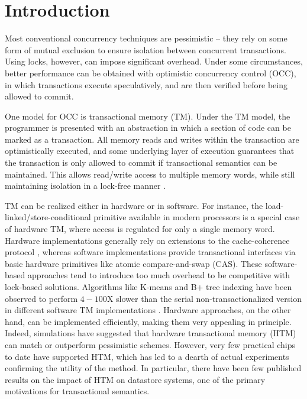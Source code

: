 \section{Introduction} \label{sec:intro}

Most conventional concurrency techniques are pessimistic -- they rely on some
form of mutual exclusion to ensure isolation between concurrent
transactions. Using locks, however, can impose significant overhead. Under some
circumstances, better performance can be obtained with optimistic concurrency
control (OCC), in which transactions execute speculatively, and are then
verified before being allowed to commit.

One model for OCC is transactional memory (TM). Under the TM model, the
programmer is presented with an abstraction in which a section of code can be
marked as a transaction. All memory reads and writes within the transaction are
optimistically executed, and some underlying layer of execution guarantees that
the transaction is only allowed to commit if transactional semantics can be
maintained. This allows read/write access to multiple memory words, while still
maintaining isolation in a lock-free manner \citep{Herlihy93}.

TM can be realized either in hardware or in software. For instance, the
load-linked/store-conditional primitive available in modern processors is a
special case of hardware TM, where access is regulated for only a single memory
word. Hardware implementations generally rely on extensions to the
cache-coherence protocol \citep{htm}, whereas software implementations provide transactional
interfaces via basic hardware primitives like atomic compare-and-swap
(CAS). These software-based approaches tend to introduce too much overhead to be
competitive with lock-based solutions. Algorithms like K-means and 
B+ tree indexing have been observed to perform $4-100$X
slower than the serial non-transactionalized version in different 
software TM implementations \citep{cacm08}. 
Hardware approaches, on the other hand,
can be implemented efficiently, making them very appealing in principle. Indeed,
simulations have suggested that hardware transactional memory (HTM) can match or
outperform pessimistic schemes. However, very few practical chips to date have
supported HTM, which has led to a dearth of actual experiments confirming the
utility of the method. In particular, there have been few published results on
the impact of HTM on datastore systems, one of the primary motivations for
transactional semantics.

